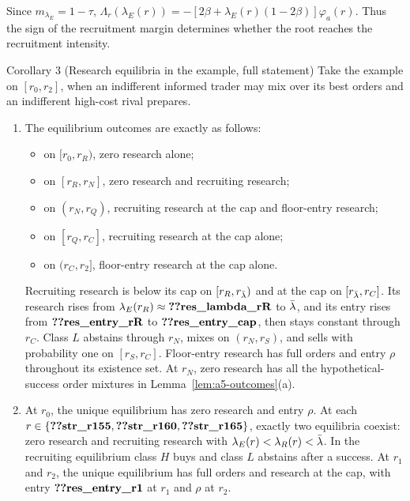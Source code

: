 Since \(m_{\lambda_E}=1-\tau\),
\(\Lambda_r(\lambda_E(r))=-[2\beta+\lambda_E(r)(1-2\beta)]\varphi_a(r)\).
Thus the sign of the recruitment margin determines whether the root reaches the recruitment intensity.

\begin{named}{Corollary 3 (Research equilibria in the example, full statement)}
Take the example on \([r_0,r_2]\), when an indifferent informed trader may mix over its best orders and an indifferent
high-cost rival prepares.
\begin{enumerate}[label=(\alph*),leftmargin=2em]
\item The equilibrium outcomes are exactly as follows:
\begin{itemize}[leftmargin=1.5em]
\item on \([r_0,r_R)\), zero research alone;
\item on \([r_R,r_N]\), zero research and recruiting research;
\item on \((r_N,r_Q)\), recruiting research at the cap and floor-entry research;
\item on \([r_Q,r_C]\), recruiting research at the cap alone;
\item on \((r_C,r_2]\), floor-entry research at the cap alone.
\end{itemize}
Recruiting research is below its cap on \([r_R,r_{\bar\lambda})\) and at the cap on \([r_{\bar\lambda},r_C]\). Its research
rises from \(\lambda_E(r_R)\approx\reg{res_lambda_rR}\) to \(\bar\lambda\), and its entry rises from
\(\reg{res_entry_rR}\) to \(\reg{res_entry_cap}\), then stays constant through \(r_C\).
Class \(L\) abstains through \(r_N\), mixes on \((r_N,r_S)\), and sells with probability one on \([r_S,r_C]\).
Floor-entry research has full orders and entry \(\rho\) throughout its existence set. At \(r_N\), zero research
has all the hypothetical-success order mixtures in Lemma~\ref{lem:a5-outcomes}(a).
\item At \(r_0\), the unique equilibrium has zero research and entry \(\rho\).
At each \(r\in\{\reg{str_r155},\reg{str_r160},\reg{str_r165}\}\), exactly two equilibria coexist: zero research
and recruiting research with \(\lambda_E(r)<\lambda_R(r)<\bar\lambda\). In the recruiting equilibrium class \(H\) buys
and class \(L\) abstains after a success. At \(r_1\) and \(r_2\), the unique equilibrium has full orders and
research at the cap, with entry \(\reg{res_entry_r1}\) at \(r_1\) and \(\rho\) at \(r_2\).
\end{enumerate}
\end{named}


